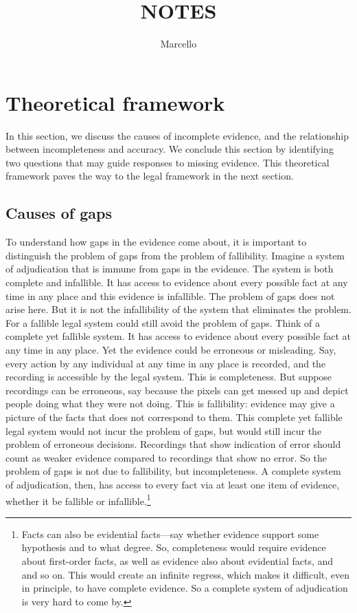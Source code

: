 \documentclass[
  10pt,
  dvipsnames,enabledeprecatedfontcommands]{scrartcl}
\title{NOTES}
\author{Marcello}
\date{}
\begin{document}
\maketitle

\hypertarget{theoretical-framework}{%
\section{Theoretical framework}\label{theoretical-framework}}

In this section, we discuss the causes of incomplete evidence, and the
relationship between incompleteness and accuracy. We conclude this
section by identifying two questions that may guide responses to missing
evidence. This theoretical framework paves the way to the legal
framework in the next section.

\hypertarget{causes-of-gaps}{%
\subsection{Causes of gaps}\label{causes-of-gaps}}

To understand how gaps in the evidence come about, it is important to
distinguish the problem of gaps from the problem of fallibility. Imagine
a system of adjudication that is immune from gaps in the evidence. The
system is both complete and infallible. It has access to evidence about
every possible fact at any time in any place and this evidence is
infallible. The problem of gaps does not arise here. But it is not the
infallibility of the system that eliminates the problem. For a fallible
legal system could still avoid the problem of gaps. Think of a complete
yet fallible system. It has access to evidence about every possible fact
at any time in any place. Yet the evidence could be erroneous or
misleading. Say, every action by any individual at any time in any place
is recorded, and the recording is accessible by the legal system. This
is completeness. But suppose recordings can be erroneous, say because
the pixels can get messed up and depict people doing what they were not
doing. This is fallibility: evidence may give a picture of the facts
that does not correspond to them. This complete yet fallible legal
system would not incur the problem of gaps, but would still incur the
problem of erroneous decisions. Recordings that show indication of error
should count as weaker evidence compared to recordings that show no
error. So the problem of gaps is not due to fallibility, but
incompleteness. A complete system of adjudication, then, has access to
every fact via at least one item of evidence, whether it be fallible or
infallible.\footnote{Facts can also be evidential facts---say whether
  evidence support some hypothesis and to what degree. So, completeness
  would require evidence about first-order facts, as well as evidence
  also about evidential facts, and and so on. This would create an
  infinite regress, which makes it difficult, even in principle, to have
  complete evidence. So a complete system of adjudication is very hard
  to come by.}
\end{document}
